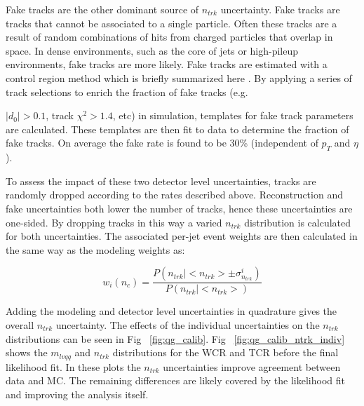 Fake tracks are the other dominant source of $n_{trk}$ uncertainty. Fake tracks are tracks that cannot be associated to a single particle. Often these tracks are a result of random combinations of hits from charged particles that overlap in space. In dense environments, such as the core of jets or high-pileup environments, fake tracks are more likely. Fake tracks are estimated with a control region method which is briefly summarized here \cite{FakeTracks}. By applying a series of track selections to enrich the fraction of fake tracks (e.g. {$|d_{0}| > 0.1$, track $\chi^{2}>1.4$, etc) in simulation, templates for fake track parameters are calculated. These templates are then fit to data to determine the fraction of fake tracks. On average the fake rate is found to be 30\% (independent of $p_{T}$ and $\eta$).

To assess the impact of these two detector level uncertainties, tracks are randomly dropped according to the rates described above. Reconstruction and fake uncertainties both lower the number of tracks, hence these uncertainties are one-sided. By dropping tracks in this way a varied $n_{trk}$ distribution is calculated for both uncertainties. The associated per-jet event weights are then calculated in the same way as the modeling weights as:

\begin{equation}
w_{i}(n_{c}) = \frac{P(n_{trk}|<n_{trk}> \pm \sigma^{i}_{n_{trk}})} {P(n_{trk}|<n_{trk}>)}
\end{equation}


Adding the modeling and detector level uncertainties in quadrature gives the overall $n_{trk}$ uncertainty. The effects of the individual uncertainties on the $n_{trk}$ distributions can be seen in Fig ~\ref{fig:qg_calib}. Fig ~\ref{fig:qg_calib_ntrk_indiv} shows the $m_{lvqq}$ and $n_{trk}$ distributions for the WCR and TCR before the final likelihood fit. In these plots the $n_{trk}$ uncertainties improve agreement between data and MC. The remaining differences are likely covered by the likelihood fit and improving the analysis itself.  

}

